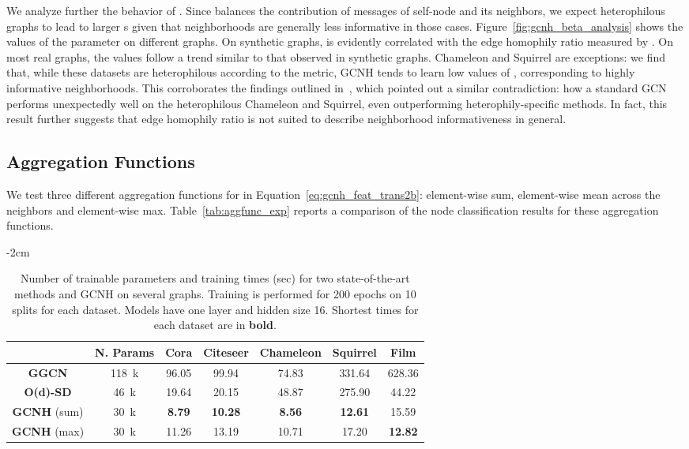 \documentclass[conference]{IEEEtran}
\begin{document}
We analyze further the behavior of .
Since  balances the contribution of messages of self-node and its neighbors, we expect heterophilous graphs to lead to larger s given that neighborhoods are generally less informative in those cases.
Figure~\ref{fig:gcnh_beta_analysis} shows the values of the parameter  on different graphs.
On synthetic graphs,  is evidently correlated with the edge homophily ratio measured by .
On most real graphs, the values follow a trend similar to that observed in synthetic graphs.
Chameleon and Squirrel are exceptions: we find that, while these datasets are heterophilous according to the  metric, GCNH tends to learn low values of , corresponding to highly informative neighborhoods.
This corroborates the findings outlined in~\cite{ma_is_2022}, which pointed out a similar contradiction: how a standard GCN performs unexpectedly well on the heterophilous Chameleon and Squirrel, even outperforming heterophily-specific methods.
In fact, this result further suggests that edge homophily ratio is not suited to describe neighborhood informativeness in general.


\subsection{Aggregation Functions}
\label{sec:agg_func}
We test three different aggregation functions for  in Equation~\eqref{eq:gcnh_feat_trans2b}: element-wise sum, element-wise mean across the neighbors and element-wise max. 
Table~\ref{tab:aggfunc_exp} reports a comparison of the node classification results for these aggregation functions.


\begin{table}
    \centering
    \footnotesize
    \addtolength{\leftskip} {-2cm}
    \addtolength{\rightskip}{-2cm}
    \setlength{\tabcolsep}{0.3em}
    \begin{tabular}{ c c | c c c c c}
    \toprule
     & \textbf{N. Params} & \textbf{Cora} & \textbf{Citeseer} & \textbf{Chameleon} & \textbf{Squirrel} & \textbf{Film} \\
    \midrule
\textbf{GGCN} & 118~k & 96.05 & 99.94 & 74.83 & 331.64 & 628.36  \\
    \textbf{O(d)-SD} & 46~k & 19.64 & 20.15 & 48.87 & 275.90 & 44.22 \\
    \midrule
    \textbf{GCNH} (sum) & 30~k & \textbf{8.79} & \textbf{10.28} & \textbf{8.56} & \textbf{12.61} & 15.59 \\
\textbf{GCNH} (max) & 30~k & 11.26 & 13.19 & 10.71 & 17.20 & \textbf{12.82}\\
    \bottomrule
    
    \end{tabular}
    \caption{Number of trainable parameters and training times (sec) for two state-of-the-art methods and GCNH on several graphs. Training is performed for 200 epochs on 10 splits for each dataset. Models have one layer and hidden size 16. Shortest times for each dataset are in \textbf{bold}.}
    \label{tab:training times}
\end{table}
\end{document}
